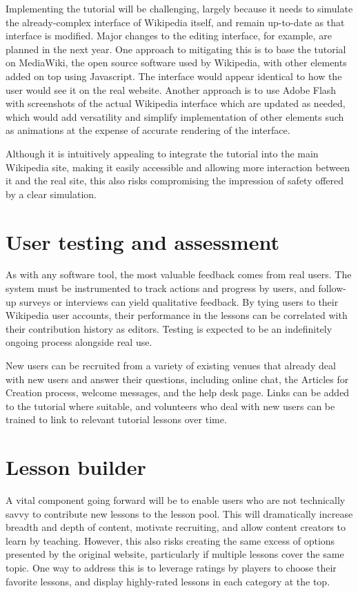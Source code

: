 \documentclass{acm_proc_article-sp}
\begin{document}
Implementing the tutorial will be challenging, largely because it needs to simulate the already-complex interface of Wikipedia itself, and remain up-to-date as that interface is modified. Major changes to the editing interface, for example,  are planned in the next year. One approach to mitigating this is to base the tutorial on MediaWiki, the open source software used by Wikipedia, with other elements added on top using Javascript. The interface would appear identical to how the user would see it on the real website. Another approach is to use Adobe Flash with screenshots of the actual Wikipedia interface which are updated as needed, which would add versatility and simplify implementation of other elements such as animations at the expense of accurate rendering of the interface.

Although it is intuitively appealing to integrate the tutorial into the main Wikipedia site, making it easily accessible and allowing more interaction between it and the real site, this also risks compromising the impression of safety offered by a clear simulation.

\section{User testing and assessment}

As with any software tool, the most valuable feedback comes from real users. The system must be instrumented to track actions and progress by users, and follow-up surveys or interviews can yield qualitative feedback. By tying users to their Wikipedia user accounts, their performance in the lessons can be correlated with their contribution history as editors. Testing is expected to be an indefinitely ongoing process alongside real use.

New users can be recruited from a variety of existing venues that already deal with new users and answer their questions, including online chat, the Articles for Creation process, welcome messages, and the help desk page. Links can be added to the tutorial where suitable, and volunteers who deal with new users can be trained to link to relevant tutorial lessons over time.

\section{Lesson builder}

A vital component going forward will be to enable users who are not technically savvy to contribute new lessons to the lesson pool. This will dramatically increase breadth and depth of content, motivate recruiting, and allow content creators to learn by teaching. However, this also risks creating the same excess of options presented by the original website, particularly if multiple lessons cover the same topic. One way to address this is to leverage ratings by players to choose their favorite lessons, and display highly-rated lessons in each category at the top.
\end{document}
